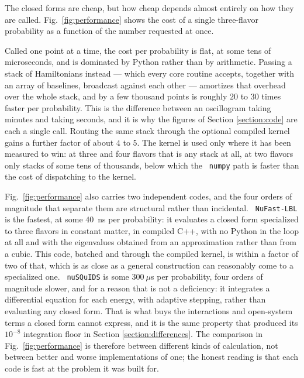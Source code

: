\documentclass[final,5p,times,twocolumn]{elsarticle}
\newcommand{\fig}{Fig.}
\newcommand{\figu}[1]{\fig~\ref{fig:#1}}
\providecommand{\DIFaddtex}[1]{{\protect\color{blue} \sf #1}} %
\providecommand{\DIFadd}[1]{\DIFaddtex{#1}} %
\begin{document}
\DIFadd{The closed forms are cheap, but how cheap depends almost entirely on how they are called.  \figu{performance} shows the cost of a single three-flavor probability as a function of the number requested at once.
}

\DIFadd{Called one point at a time, the cost per probability is flat, at some tens of microseconds, and is dominated by Python rather than by arithmetic.  Passing a stack of Hamiltonians instead --- which every core routine accepts, together with an array of baselines, broadcast against each other --- amortizes that overhead over the whole stack, and by a few thousand points is roughly $20$ to $30$ times faster per probability.  This is the difference between an oscillogram taking minutes and taking seconds, and it is why the figures of Section \ref{section:code} are each a single call.  Routing the same stack through the optional compiled kernel gains a further factor of about $4$ to $5$.  The kernel is used only where it has been measured to win: at three and four flavors that is any stack at all, at two flavors only stacks of some tens of thousands, below which the }{\tt \DIFadd{numpy}} \DIFadd{path is faster than the cost of dispatching to the kernel.
}

\DIFadd{\figu{performance} also carries two independent codes, and the four orders of magnitude that separate them are structural rather than incidental.  }{\tt \DIFadd{NuFast-LBL}} \DIFadd{is the fastest, at some $40$~ns per probability: it evaluates a closed form specialized to three flavors in constant matter, in compiled C++, with no Python in the loop at all and with the eigenvalues obtained from an approximation rather than from a cubic.  This code, batched and through the compiled kernel, is within a factor of two of that, which is as close as a general construction can reasonably come to a specialized one.  }{\tt \DIFadd{nuSQuIDS}} \DIFadd{is some $300~\mu$s per probability, four orders of magnitude slower, and for a reason that is not a deficiency: it integrates a differential equation for each energy, with adaptive stepping, rather than evaluating any closed form.  That is what buys the interactions and open-system terms a closed form cannot express, and it is the same property that produced its $10^{-8}$ integration floor in Section \ref{section:differences}.  The comparison in \figu{performance} is therefore between different kinds of calculation, not between better and worse implementations of one; the honest reading is that each code is fast at the problem it was built for.
}
\end{document}
